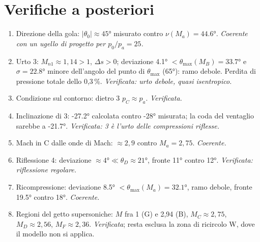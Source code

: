 \documentclass[11pt,a4paper]{article}
\begin{document}
\section{Verifiche a posteriori}
\begin{enumerate}
\item Direzione della gola: $|\theta_0|\approx\ang{45}$ misurato contro $\nu(M_a)=\ang{44.6}$. \emph{Coerente con un
  ugello di progetto per $p_0/p_a=25$.}
\item Urto 3: $M_{n1}\approx1{,}14>1$, $\Delta s>0$; deviazione \ang{4.1} $<\theta_{\max}(M_B)=\ang{33.7}$ e
  $\sigma=\ang{22.8}$ minore dell'angolo del punto di $\theta_{\max}$ (\ang{65}): ramo debole. Perdita di pressione
  totale dello 0,3\,\%. \emph{Verificata: urto debole, quasi isentropico.}
\item Condizione sul contorno: dietro 3 $p_C\approx p_a$. \emph{Verificata.}
\item Inclinazione di 3: \ang{-27.2} calcolata contro \ang{-28} misurata; la coda del ventaglio sarebbe a
  \ang{-21.7}. \emph{Verificata: 3 è l'urto delle compressioni riflesse.}
\item Mach in C dalle onde di Mach: $\approx2{,}9$ contro $M_a=2{,}75$. \emph{Coerente.}
\item Riflessione 4: deviazione $\approx\ang{4}\ll\theta_D\approx\ang{21}$, fronte \ang{11} contro \ang{12}.
  \emph{Verificata: riflessione regolare.}
\item Ricompressione: deviazione \ang{8.5} $<\theta_{\max}(M_a)=\ang{32.1}$, ramo debole, fronte \ang{19.5} contro
  \ang{18}. \emph{Coerente.}
\item Regioni del getto supersoniche: $M$ fra 1 (G) e 2,94 (B), $M_C\approx2{,}75$, $M_D\approx2{,}56$,
  $M_F\approx2{,}36$. \emph{Verificata}; resta esclusa la zona di ricircolo W, dove il modello non si applica.
\end{enumerate}

\end{document}
